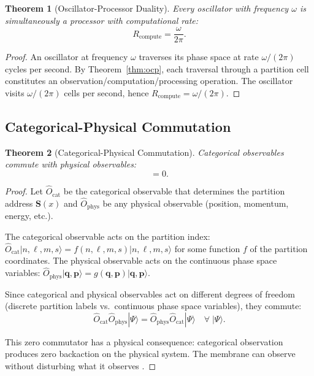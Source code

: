 \documentclass[12pt]{article}
\newtheorem{theorem}{Theorem}[section]
\theoremstyle{definition}
\theoremstyle{remark}
\newcommand{\Ocat}{\hat{O}_{\mathrm{cat}}}
\newcommand{\Ophys}{\hat{O}_{\mathrm{phys}}}
\newcommand{\Rcompute}{R_{\mathrm{compute}}}
\begin{document}
\begin{theorem}[Oscillator-Processor Duality]
\label{thm:osc_proc}
Every oscillator with frequency $\omega$ is simultaneously a processor with computational rate:
\begin{equation}
  \Rcompute = \frac{\omega}{2\pi}.
  \label{eq:osc_proc}
\end{equation}
\end{theorem}

\begin{proof}
An oscillator at frequency $\omega$ traverses its phase space at rate $\omega/(2\pi)$ cycles per second. By Theorem~\ref{thm:ocp}, each traversal through a partition cell constitutes an observation/computation/processing operation. The oscillator visits $\omega/(2\pi)$ cells per second, hence $\Rcompute = \omega/(2\pi)$.
\end{proof}

\subsection{Categorical-Physical Commutation}

\begin{theorem}[Categorical-Physical Commutation]
\label{thm:commutation}
Categorical observables commute with physical observables:
\begin{equation}
  [\Ocat, \Ophys] = 0.
  \label{eq:commutation}
\end{equation}
\end{theorem}

\begin{proof}
Let $\Ocat$ be the categorical observable that determines the partition address $\mathbf{S}(x)$ and $\Ophys$ be any physical observable (position, momentum, energy, etc.).

The categorical observable acts on the partition index: $\Ocat |n, \ell, m, s\rangle = f(n,\ell,m,s)|n,\ell,m,s\rangle$ for some function $f$ of the partition coordinates. The physical observable acts on the continuous phase space variables: $\Ophys |\mathbf{q}, \mathbf{p}\rangle = g(\mathbf{q},\mathbf{p})|\mathbf{q},\mathbf{p}\rangle$.

Since categorical and physical observables act on different degrees of freedom (discrete partition labels vs.\ continuous phase space variables), they commute:
\begin{equation}
  \Ocat \Ophys |\Psi\rangle = \Ophys \Ocat |\Psi\rangle \quad \forall\; |\Psi\rangle.
  \label{eq:commutation_proof}
\end{equation}

This zero commutator has a physical consequence: categorical observation produces zero backaction on the physical system. The membrane can observe without disturbing what it observes \cite{sachikonye2025quantum}.
\end{proof}
\end{document}
